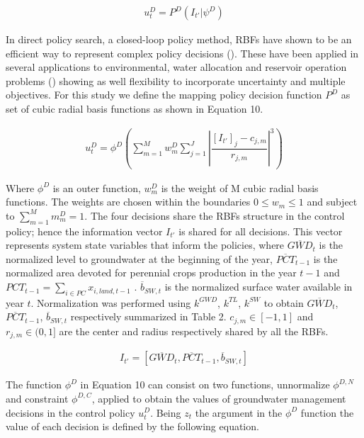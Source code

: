 \documentclass[11pt,a4paper]{article}
\begin{document}
\begin{align}
u_{t}^D = P^{D}(I_{t'}|\psi^{D})
\end{align}

In direct policy search, a closed-loop policy method, RBFs have shown to be an efficient way to represent complex policy decisions (\cite{busoniu_cross-entropy_2011}). These have been applied in several applications to environmental, water allocation and reservoir operation problems (\cite{giuliani_universal_2014,gupta_can_2020,quinn_direct_2017,garner_using_2018, zatarain_salazar_balancing_2017}) showing as well flexibility to incorporate uncertainty and multiple objectives. For this study we define the mapping policy decision function $P^D$ as set of cubic radial basis functions as shown in Equation 10.

\begin{align}
u_{t}^D = \phi^{D}\left(\sum_{m=1}^M w_{m}^D \sum_{j=1}^J \left\lvert\dfrac{[I_{t'}]_{j}-c_{j,m}}{r_{j,m}}\right\rvert^{3}\right)
\end{align}

Where $\phi^{D}$ is an outer function, $w_{m}^D$ is the weight of M cubic radial basis functions. The weights are chosen within the boundaries $ 0 \leq w_{m} \leq 1$ and subject to $\sum_{m=1}^M m_{m}^D= 1$. The four decisions share the RBFs structure in the control policy; hence the information vector $I_{t'}$ is shared for all decisions. This vector represents system state variables that inform the policies, where $\overline{GWD}_{t}$ is the normalized level to groundwater at the beginning of the year, $\overline{PCT}_{t-1}$ is the normalized area devoted for perennial crops production in the year $t-1$ and $PCT_{t-1}=\sum_{i \in PC}x_{i,land,t-1}$ . $\overline{b}_{SW,t}$ is the normalized surface water available in year $t$. Normalization was performed using $k^{GWD}$, $k^{TL}$, $k^{SW}$ to obtain $\overline{GWD}_{t}$, $\overline{PCT}_{t-1}$, $\overline{b}_{SW,t}$ respectively summarized in Table 2. $c_{j,m} \in [-1,1]$ and $r_{j,m} \in (0,1]$ are the center and radius respectively shared by all the RBFs.

\begin{align}
I_{t'} = [\overline{GWD}_{t},\overline{PCT}_{t-1},\overline{b}_{SW,t}]
\end{align}

The function $\phi^{D}$ in Equation 10 can consist on two functions, unnormalize $\phi^{D,N}$ and constraint $\phi^{D,C}$, applied to obtain the values of groundwater management decisions in the control policy $u_{t}^D$. Being $z_{t}$ the argument in the $\phi^{D}$ function the value of each decision is defined by the following equation.
\end{document}
